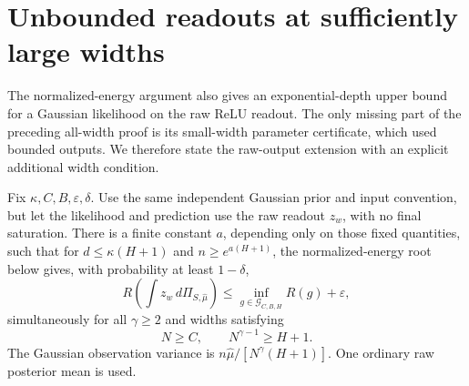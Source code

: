 \section{Unbounded readouts at sufficiently large widths}
\label{sec:raw-large-width-depth}
The normalized-energy argument also gives an exponential-depth upper bound for a Gaussian likelihood on the raw ReLU readout. The only missing part of the preceding all-width proof is its small-width parameter certificate, which used bounded outputs. We therefore state the raw-output extension with an explicit additional width condition.

\begin{theorem}
\label{thm:raw-large-width-depth}
Fix $\kappa,C,B,\varepsilon,\delta$. Use the same independent Gaussian prior and input convention, but let the likelihood and prediction use the raw readout $z_w$, with no final saturation. There is a finite constant $a$, depending only on those fixed quantities, such that for $d\le\kappa(H+1)$ and $n\ge e^{a(H+1)}$, the normalized-energy root below gives, with probability at least $1-\delta$,
\[
 R\left(\int z_w\,d\Pi_{S,\widehat\mu}\right)
 \le\inf_{g\in\mathcal G_{C,B,H}}R(g)+\varepsilon,
\]
simultaneously for all $\gamma\ge2$ and widths satisfying
\[
 N\ge C,\qquad N^{\gamma-1}\ge H+1.
\]
The Gaussian observation variance is $n\widehat\mu/[N^\gamma(H+1)]$. One ordinary raw posterior mean is used.
\end{theorem}
